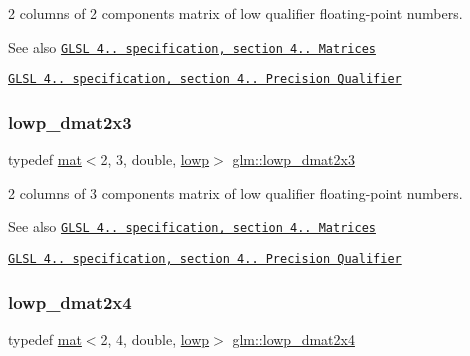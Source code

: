 2 columns of 2 components matrix of low qualifier floating-\/point numbers.

\begin{DoxySeeAlso}{See also}
\href{http://www.opengl.org/registry/doc/GLSLangSpec.4.20.8.pdf}{\tt G\+L\+SL 4.. specification, section 4.. Matrices} 

\href{http://www.opengl.org/registry/doc/GLSLangSpec.4.20.8.pdf}{\tt G\+L\+SL 4.. specification, section 4.. Precision Qualifier} 
\end{DoxySeeAlso}
\mbox{\label{group__core__precision_gae5263863de4793ff33184db9a6bd3620}} 
\subsubsection{\texorpdfstring{lowp\+\_\+dmat2x3}{lowp\_dmat2x3}}
{\footnotesize\ttfamily typedef \hyperlink{structglm_1_1mat}{mat}$<$2, 3, double, \hyperlink{namespaceglm_a36ed105b07c7746804d7fdc7cc90ff25ae161af3fc695e696ce3bf69f7332bc2d}{lowp}$>$ \hyperlink{group__core__precision_gae5263863de4793ff33184db9a6bd3620}{glm\+::lowp\+\_\+dmat2x3}}

2 columns of 3 components matrix of low qualifier floating-\/point numbers.

\begin{DoxySeeAlso}{See also}
\href{http://www.opengl.org/registry/doc/GLSLangSpec.4.20.8.pdf}{\tt G\+L\+SL 4.. specification, section 4.. Matrices} 

\href{http://www.opengl.org/registry/doc/GLSLangSpec.4.20.8.pdf}{\tt G\+L\+SL 4.. specification, section 4.. Precision Qualifier} 
\end{DoxySeeAlso}
\mbox{\label{group__core__precision_ga7832375b36ade5886dd947a2a378d1ac}} 
\subsubsection{\texorpdfstring{lowp\+\_\+dmat2x4}{lowp\_dmat2x4}}
{\footnotesize\ttfamily typedef \hyperlink{structglm_1_1mat}{mat}$<$2, 4, double, \hyperlink{namespaceglm_a36ed105b07c7746804d7fdc7cc90ff25ae161af3fc695e696ce3bf69f7332bc2d}{lowp}$>$ \hyperlink{group__core__precision_ga7832375b36ade5886dd947a2a378d1ac}{glm\+::lowp\+\_\+dmat2x4}}

